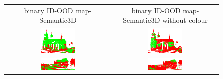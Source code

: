     \begin{figure}[h!]
        \centering
        \begin{tabular}{cc}
            binary ID-OOD map-Semantic3D & binary ID-OOD map-Semantic3D without colour \\
            \includegraphics[width=0.33\textwidth, height=0.18\textheight]{images/ood_imgs/sem3d_of/ent/fout_sem3d_OOD_1.pdf}&
            \includegraphics[width=0.33\textwidth, height=0.18\textheight]{images/ood_imgs/sem3d_of/ent/fout_sem3d_of_OOD_1.pdf}\\

            \includegraphics[width=0.33\textwidth, height=0.18\textheight]{images/ood_imgs/sem3d_of/ent/fout_sem3d_OOD_2.pdf}&
            \includegraphics[width=0.33\textwidth, height=0.18\textheight]{images/ood_imgs/sem3d_of/ent/fout_sem3d_of_OOD_2.pdf}\\


\end{tabular}
\end{figure}
